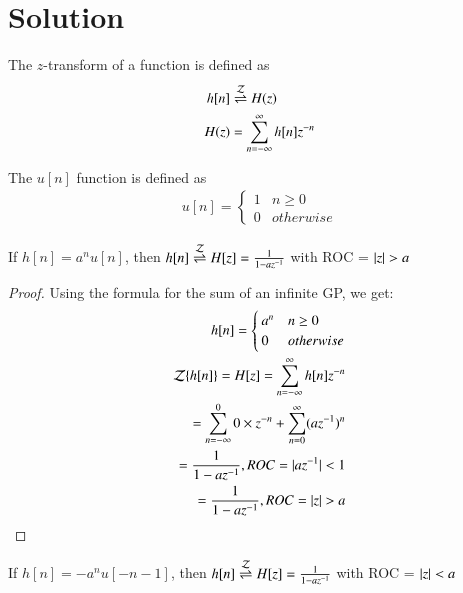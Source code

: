 \documentclass[journal,12pt,twocolumn]{IEEEtran}
\begin{document}
\section*{Solution}
\begin{definition}\label{def:z}
    The $z$-transform of a function is defined as
    \begin{align}
        h[n] &\overset{\mathcal{Z}}{ \rightleftharpoons} H(z)\\
        H(z) &=\sum_{n=-\infty}^{\infty} h[n]z^{-n}
    \end{align}
\end{definition}
\begin{definition}\label{def:u_n}
    The $u[n]$ function is defined as
    \begin{align}
        u[n] = 
        \begin{cases}
        1 & n\geq0\\
        0 & otherwise
        \end{cases}
    \end{align}
\end{definition}
\begin{lemma}
If $h[n] = a^nu[n]$, then $h[n] \overset{\mathcal{Z}}{ \rightleftharpoons} H[z] = \frac{1}{1 - az^{-1}}$ with ROC = $\vert z\vert>a$
\label{0}
\end{lemma}
\begin{proof}
Using the formula for the sum of an infinite GP, we get:
\begin{align}
    h[n] = 
    \begin{cases}
    a^n & n\geq 0\\
    0 & otherwise
    \end{cases}\\
    \mathcal{Z}\{h[n]\} = H[z] = \sum_{n = -\infty}^\infty h[n]z^{-n}\\
    = \sum_{n = -\infty}^0 0 \times z^{-n} + \sum_{n = 0}^{\infty} (az^{-1})^n\\
     = \frac{1}{1 - az^{-1}} , ROC = \vert az^{-1}\vert < 1\\
      = \frac{1}{1 - az^{-1}} , ROC =  \vert z\vert > a
\end{align}
\end{proof}
\begin{lemma}
If $h[n] = -a^nu[-n-1]$, then $h[n] \overset{\mathcal{Z}}{ \rightleftharpoons} H[z] = \frac{1}{1 - az^{-1}}$ with ROC = $\vert z\vert<a$ 
\label{1}
\end{lemma}
\end{document}
